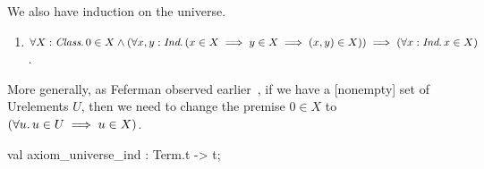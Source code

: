 \begin{node}
We also have induction on the universe.
\begin{enumerate}
  \item $\forall X:\textit{Class}\ldotp 0\in X\land(\forall
    x,y:\textit{Ind}\ldotp(x\in X\implies y\in X\implies(x,y)\in
    X))\implies(\forall x:\textit{Ind}\ldotp x\in X)$.
\end{enumerate}
More generally, as Feferman observed earlier~\cite[\S2.1]{feferman1982inductively}, if we have a [nonempty] set of Urelements $U$, then we
need to change the premise $0\in X$ to $(\forall u\ldotp u\in U\implies u\in X)$.
\end{node}

\nwenddocs{}\plusendmoddef\nwstartdeflinemarkup{}\nwenddeflinemarkup
val axiom_universe_ind : Term.t -> t;
\nwendcode{}\nwdocspar

